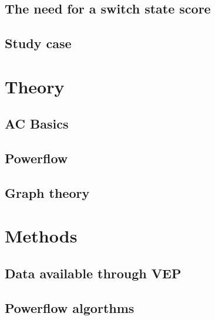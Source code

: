 \documentclass[a4paper]{report}
\begin{document}
\section{The need for a switch state score}



\section{Study case}



\chapter{Theory}


\section{AC Basics}



\section{Powerflow}



\section{Graph theory}



\chapter{Methods}

\section{Data available through VEP}



\section{Powerflow algorthms}
\end{document}
